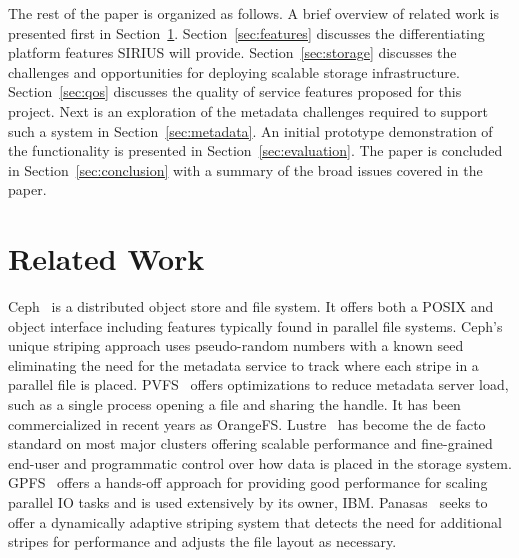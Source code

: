 \documentclass[letterpaper,twocolumn,10pt]{article}
\begin{document}

The rest of the paper is organized as follows. A brief overview of related work
is presented first in Section~\ref{sec:related}. Section~\ref{sec:features}
discusses the differentiating platform features SIRIUS will provide.
Section~\ref{sec:storage}
discusses the challenges and opportunities for deploying scalable storage
infrastructure.
Section~\ref{sec:qos}
discusses the quality of service features proposed for this project.
Next is an exploration of the metadata challenges required to support such a
system in Section~\ref{sec:metadata}.
An initial prototype demonstration of the functionality is presented in
Section~\ref{sec:evaluation}.
The paper is concluded in
Section~\ref{sec:conclusion} with a summary of the broad issues covered in the
paper.


\section{Related Work}
\label{sec:related}

Ceph~\cite{weil:ceph} is a distributed object store and file system. It offers
both a POSIX and object interface including features typically found in parallel
file systems.
Ceph's unique striping approach uses pseudo-random numbers with a
known seed eliminating the need for the metadata service to track where each
stripe in a parallel file is placed.
PVFS~\cite{carns:pvfs} offers optimizations to reduce metadata server load,
such as a single process opening a file and sharing the handle.
It has been
commercialized in recent years as OrangeFS.
Lustre~\cite{braam:lustre-arch} has become the de facto standard on most major
clusters offering scalable performance and fine-grained end-user and
programmatic control over how data is placed in the storage system.
GPFS~\cite{schmuck:gpfs} offers a hands-off approach for providing good
performance for scaling parallel IO tasks and is used extensively by its owner,
IBM.
Panasas~\cite{panasas:architecture} seeks to offer a dynamically adaptive
striping system that detects the need for additional stripes for performance
and adjusts the file layout as necessary.
\end{document}
